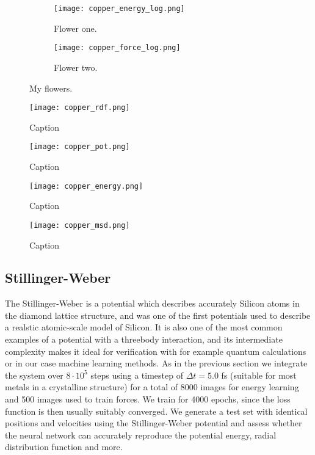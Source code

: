 \begin{figure}[!tbp]
\begin{adjustbox}{max width=1.2\linewidth,center}
\centering
  \begin{subfigure}[b]{0.55\textwidth}
      \texttt{[image: copper\_energy\_log.png]}
    \caption{Flower one.}
    \label{fig:f1}
  \end{subfigure}
  \hfill
  \begin{subfigure}[b]{0.55\textwidth}
      \texttt{[image: copper\_force\_log.png]}
    \caption{Flower two.}
    \label{fig:f2}
  \end{subfigure}
\end{adjustbox}
\caption{My flowers.}
    \label{fig:default}
\end{figure}

\begin{figure}
    \centering
    \texttt{[image: copper\_rdf.png]}
    \caption{Caption}
    \label{fig:silicon-rdf}
\end{figure}

\begin{figure}
    \centering
    \texttt{[image: copper\_pot.png]}
    \caption{Caption}
    \label{fig:silicon-energy}
\end{figure}

\begin{figure}
    \centering
    \texttt{[image: copper\_energy.png]}
    \caption{Caption}
    \label{fig:silicon-energy}
\end{figure}

\begin{figure}
    \centering
    \texttt{[image: copper\_msd.png]}
    \caption{Caption}
    \label{fig:silicon-energy}
\end{figure}

\subsection{Stillinger-Weber}
The Stillinger-Weber is a potential which describes accurately
Silicon atoms in the diamond lattice structure, and was
one of the first potentials used to describe a realstic atomic-scale
model of Silicon. It is also one of the most common examples
of a potential with a threebody interaction, and its intermediate complexity
makes it ideal for verification with for example quantum calculations
or in our case machine learning methods.
As in the previous section we integrate the system over $8 \cdot 10^5$
steps using a timestep of $\Delta t = 5.0$ fs (suitable for most metals
in a crystalline structure) for a total of 8000 images for energy learning
and 500 images used to train forces. We train for 4000 epochs, since
the loss function is then usually suitably converged.
We generate a test set with identical positions and velocities
using the Stillinger-Weber potential and assess whether the neural network
can accurately reproduce the potential energy, radial distribution function
and more.

